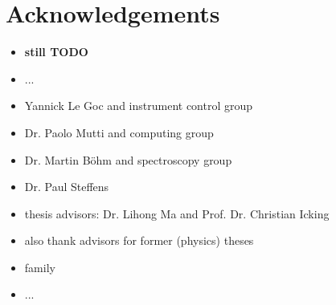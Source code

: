 \chapter*{Acknowledgements}

\begin{itemize}
	\item {\bf still TODO}
	\item ...
	\item Yannick Le Goc and instrument control group
	\item Dr. Paolo Mutti and computing group
	\item Dr. Martin B\"ohm and spectroscopy group
	\item Dr. Paul Steffens
	\item thesis advisors: Dr. Lihong Ma and Prof. Dr. Christian Icking
	\item also thank advisors for former (physics) theses
	\item family
	\item ...
\end{itemize}

